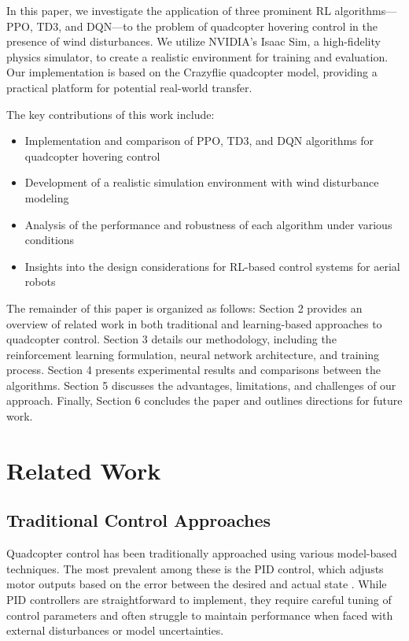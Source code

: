 \documentclass[12pt]{article}
\begin{document}
In this paper, we investigate the application of three prominent RL algorithms—PPO, TD3, and DQN—to the problem of quadcopter hovering control in the presence of wind disturbances. We utilize NVIDIA's Isaac Sim, a high-fidelity physics simulator, to create a realistic environment for training and evaluation. Our implementation is based on the Crazyflie quadcopter model, providing a practical platform for potential real-world transfer.

The key contributions of this work include:
\begin{itemize}
    \item Implementation and comparison of PPO, TD3, and DQN algorithms for quadcopter hovering control
    \item Development of a realistic simulation environment with wind disturbance modeling
    \item Analysis of the performance and robustness of each algorithm under various conditions
    \item Insights into the design considerations for RL-based control systems for aerial robots
\end{itemize}

The remainder of this paper is organized as follows: Section 2 provides an overview of related work in both traditional and learning-based approaches to quadcopter control. Section 3 details our methodology, including the reinforcement learning formulation, neural network architecture, and training process. Section 4 presents experimental results and comparisons between the algorithms. Section 5 discusses the advantages, limitations, and challenges of our approach. Finally, Section 6 concludes the paper and outlines directions for future work.

\section{Related Work}
\subsection{Traditional Control Approaches}

Quadcopter control has been traditionally approached using various model-based techniques. The most prevalent among these is the PID control, which adjusts motor outputs based on the error between the desired and actual state \cite{bouabdallah2004pid}. While PID controllers are straightforward to implement, they require careful tuning of control parameters and often struggle to maintain performance when faced with external disturbances or model uncertainties.
\end{document}
